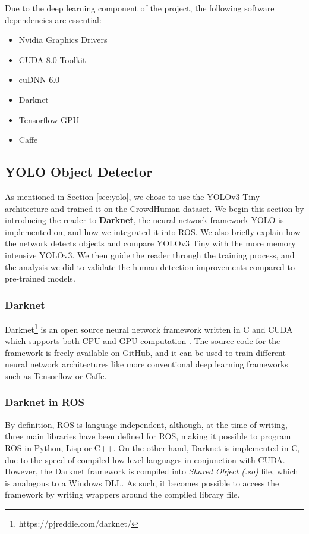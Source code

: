 Due to the deep learning component of the project, the following software dependencies are essential:
\begin{itemize}
    \item Nvidia Graphics Drivers 
    \item CUDA 8.0 Toolkit
    \item cuDNN 6.0
    \item Darknet
    \item Tensorflow-GPU
    \item Caffe
\end{itemize}

\subsection{YOLO Object Detector}
As mentioned in Section \ref{sec:yolo}, we chose to use the YOLOv3 Tiny architecture and trained it on the CrowdHuman dataset. We begin this section by introducing the reader to \textbf{Darknet}, the neural network framework YOLO is implemented on, and how we integrated it into ROS. We also briefly explain how the network detects objects and compare YOLOv3 Tiny with the more memory intensive YOLOv3. We then guide the reader through the training process, and the analysis we did to validate the human detection improvements compared to pre-trained models.

\subsubsection{Darknet}
Darknet\footnote{https://pjreddie.com/darknet/} is an open source neural network framework written in C and CUDA which supports both CPU and GPU computation \cite{darknet13}. The source code for the framework is freely available on GitHub, and it can be used to train different neural network architectures like more conventional deep learning frameworks such as Tensorflow or Caffe.

\subsubsection{Darknet in ROS}
By definition, ROS is language-independent, although, at the time of writing, three main libraries have been defined for ROS, making it possible to program ROS in Python, Lisp or C++. On the other hand, Darknet is implemented in C, due to the speed of compiled low-level languages in conjunction with CUDA. However, the Darknet framework is compiled into \textit{Shared Object (.so)} file, which is analogous to a Windows DLL. As such, it becomes possible to access the framework by writing wrappers around the compiled library file.

